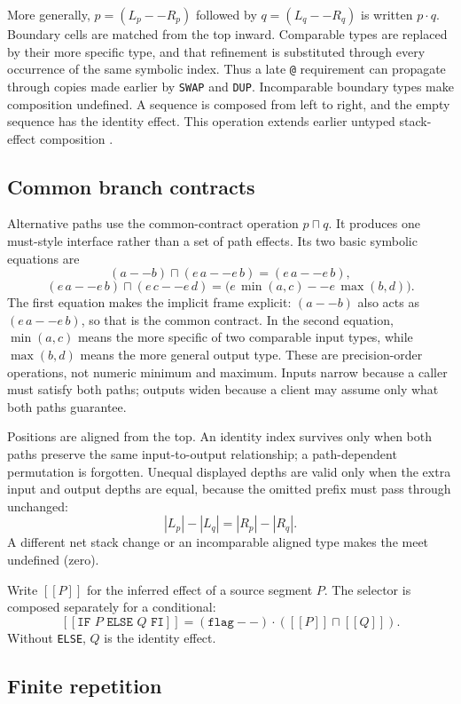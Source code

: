 \documentclass[11pt,a4paper]{article}
\newcommand{\meet}{\mathbin{\sqcap}}
\newcommand{\seq}{\mathbin{\cdot}}
\newcommand{\sem}[1]{[\![#1]\!]}
\begin{document}
More generally, $p=(L_p -- R_p)$ followed by $q=(L_q -- R_q)$ is written
$p\seq q$.  Boundary cells are matched from the top inward.  Comparable types
are replaced by their more specific type, and that refinement is substituted
through every occurrence of the same symbolic index.  Thus a late
\texttt{@} requirement can propagate through copies made earlier by
\texttt{SWAP} and \texttt{DUP}.  Incomparable boundary types make composition
undefined.  A sequence is composed from left to right, and the empty sequence
has the identity effect.  This operation extends earlier untyped stack-effect
composition \cite{poial1994}.

\subsection{Common branch contracts}

Alternative paths use the common-contract operation $p\meet q$.  It produces
one must-style interface rather than a set of path effects.  Its two basic
symbolic equations are
\[
 (a -- b)\meet(e\,a -- e\,b)=(e\,a -- e\,b),
\]
\[
 (e\,a -- e\,b)\meet(e\,c -- e\,d)
   =\bigl(e\,\min(a,c) -- e\,\max(b,d)\bigr).
\]
The first equation makes the implicit frame explicit: $(a--b)$ also acts as
$(e\,a--e\,b)$, so that is the common contract.  In the second equation,
$\min(a,c)$ means the more specific of two comparable input types, while
$\max(b,d)$ means the more general output type.  These are precision-order
operations, not numeric minimum and maximum.  Inputs narrow because a caller
must satisfy both paths; outputs widen because a client may assume only what
both paths guarantee.

Positions are aligned from the top.  An identity index survives only when both
paths preserve the same input-to-output relationship; a path-dependent
permutation is forgotten.  Unequal displayed depths are valid only when the
extra input and output depths are equal, because the omitted prefix must pass
through unchanged:
\[
 |L_p|-|L_q| = |R_p|-|R_q|.
\]
A different net stack change or an incomparable aligned type makes the meet
undefined (zero).

Write $\sem{P}$ for the inferred effect of a source segment $P$.  The selector
is composed separately for a conditional:
\[
 \sem{\texttt{IF }P\texttt{ ELSE }Q\texttt{ FI}}
   = (\texttt{flag}--)\seq(\sem{P}\meet\sem{Q}).
\]
Without \texttt{ELSE}, $Q$ is the identity effect.

\subsection{Finite repetition}
\label{sec:repeat-op}
\end{document}

